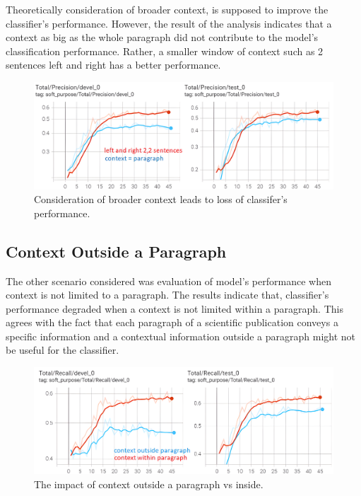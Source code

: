 Theoretically consideration of broader context, is supposed to improve the classifier’s performance. However, the result of the analysis indicates that a context as big as the whole paragraph did not contribute to the model’s classification performance. Rather, a smaller window of context such as 2 sentences left and right has a better performance. 

\begin{figure}[htbp]
	\centering
	\includegraphics[width=.90\textwidth]{4.graphics/figures/ch_6/3.paragraph_context_vs_22/HD/1}
	\caption{Consideration of broader context leads to loss of classifer's performance.}
	\label{fig:chapter06:with}
\end{figure}


\subsection{Context Outside a Paragraph}
\label{sec:chapter06:contxtOutside}


The other scenario considered was evaluation of model’s performance when context is not limited to a paragraph. The results indicate that, classifier’s performance degraded when a context is not limited within a paragraph. This agrees with the fact that each paragraph of a scientific publication conveys a specific information and a contextual information outside a paragraph might not be useful for the classifier. 

\begin{figure}[htbp]
	\centering
	\includegraphics[width=.90\textwidth]{4.graphics/figures/ch_6/4.context_outside_paragraph_vs_inside/HD/1}
	\caption{The impact of context outside a paragraph vs inside.}
	\label{fig:chapter06:with}
\end{figure}

